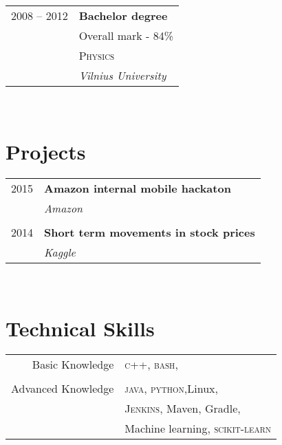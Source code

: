 \documentclass[10pt]{article} %
\begin{document}
{\begin{minipage}[t]{0.44\textwidth}
\begin{tabular}{rl}
2008 -- 2012 & \textbf{Bachelor degree}\\
& \small Overall mark - 84\% \\
& \textsc{Physics} \\ 
& \textit{Vilnius University} 
	

\end{tabular}\\[10pt]


\section{Projects} 

\begin{tabular}{rl}

2015     & \textbf{Amazon internal mobile hackaton}\\
& \textit{Amazon}\\
&\\
2014	 & \textbf{Short term movements in stock prices}\\
& \textit{Kaggle}

\end{tabular}\\[10pt]


\section{Technical Skills} 

\begin{tabular}{rl}
Basic Knowledge
& \textsc{c++}, \textsc{bash},\\
& \\
Advanced Knowledge
& \textsc{java}, \textsc{python},Linux,\\
& \textsc{Jenkins}, Maven, Gradle,\\
& Machine learning, \textsc{scikit-learn}
\end{tabular}



\end{minipage}}
\end{document}
